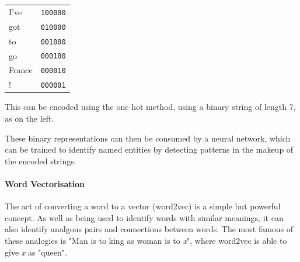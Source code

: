 \begin{minipage}{0.25\textwidth}
\begin{tabular}{ll}
I've   & \texttt{100000} \\
got	   & \texttt{010000} \\
to	   & \texttt{001000} \\  
go 	   & \texttt{000100} \\  
France & \texttt{000010} \\  
!	   & \texttt{000001} \\  
\end{tabular}
\end{minipage}
\begin{minipage}{0.68\textwidth}
This can be encoded using the one hot method, using a binary string of length 7, as on the left.

These binary representations can then be consumed by a neural network, which can be trained to identify named entities by detecting patterns in the makeup of the encoded strings.

\end{minipage}

\paragraph{Word Vectorisation}\label{lit:word2vec}

The act of converting a word to a vector (word2vec) is a simple but powerful concept. As well as being used to identify words with similar meanings, it can also identify analgous pairs and connections between words. The most famous of these analogies is "Man is to king as woman is to \textit{x}", where word2vec is able to give \textit{x} as "queen". \cite{church2017}


\begin{minipage}{1.5in}

\end{minipage}

